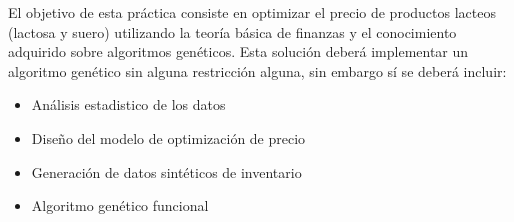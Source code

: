El objetivo de esta práctica consiste en optimizar el precio de productos lacteos (lactosa y suero) utilizando la teoría básica de finanzas y el conocimiento adquirido sobre algoritmos genéticos. Esta solución deberá implementar un algoritmo genético sin alguna restricción alguna, sin embargo sí se deberá incluir:

\begin{itemize}
	\item Análisis estadistico de los datos
	\item Diseño del modelo de optimización de precio
	\item Generación de datos sintéticos de inventario
	\item Algoritmo genético funcional
\end{itemize}
